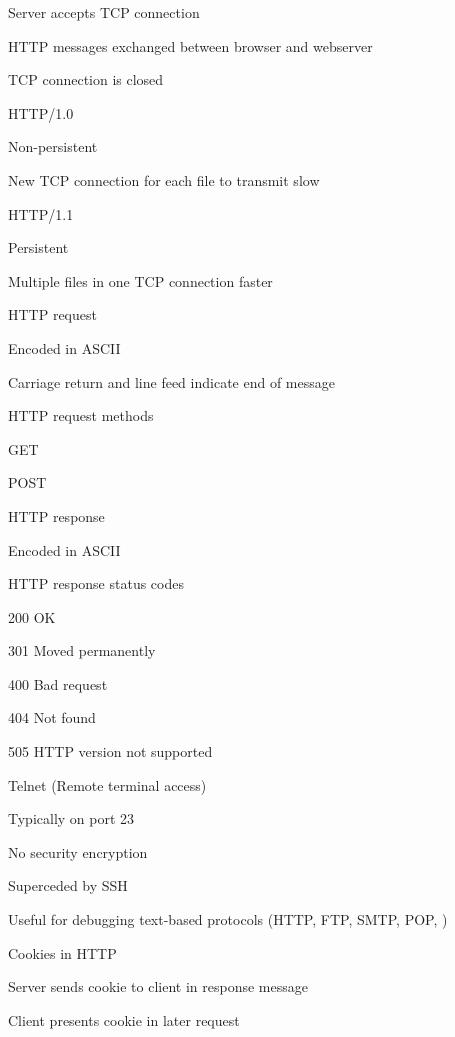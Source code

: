 			\item Server accepts TCP connection
			\item HTTP messages exchanged between browser and webserver
			\item TCP connection is closed
		\enumend
		\item HTTP/1.0
		\enumstart
			\item Non-persistent
			\item New TCP connection for each file to transmit \arrow slow
		\enumend
		\item HTTP/1.1
		\enumstart
			\item Persistent
			\item Multiple files in one TCP connection \arrow faster
		\enumend
		\item HTTP request
		\enumstart
			\item Encoded in ASCII
			\item Carriage return and line feed indicate end of message
			\\ 
		\enumend
		\item HTTP request methods
		\enumstart
			\item GET
			\item POST
		\enumend
		\item HTTP response
		\enumstart
			\item Encoded in ASCII
			\\ 
		\enumend
		\item HTTP response status codes
		\enumstart
			\item 200 OK
			\item 301 Moved permanently
			\item 400 Bad request
			\item 404 Not found
			\item 505 HTTP version not supported
		\enumend
	\enumend
	\item Telnet (Remote terminal access)
	\enumstart
		\item Typically on port 23
		\item No security encryption
		\item Superceded by SSH
		\item Useful for debugging text-based protocols (HTTP, FTP, SMTP, POP, \ddd)
	\enumend
	\item Cookies in HTTP
	\enumstart
		\item Server sends cookie to client in response message
		\item Client presents cookie in later request
